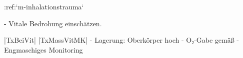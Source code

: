 :ref:`m-inhalationstrauma`
\begin{itemize}
  -   Vitale Bedrohung einschätzen. \par
  |TxBeiVit| |TxMassVitMK|
  -   Lagerung: Oberkörper hoch
  -   O₂-Gabe gemäß 
  -   Engmaschiges Monitoring
\end{itemize}